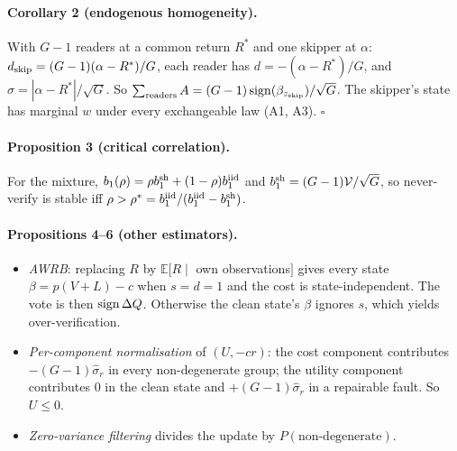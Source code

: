 \paragraph{Corollary 2 (endogenous homogeneity).} With $G-1$ readers at a common return $R^\ast$ and one skipper at
$\alpha$: $d_{\rm skip}=(G-1)(\alpha-R^\ast)/G$, each reader has $d=-(\alpha-R^\ast)/G$, and
$\hat\sigma=|\alpha-R^\ast|/\sqrt G$. So $\sum_{\rm readers}A=(G-1)\operatorname{sign}(\beta_{z_{\rm skip}})/\sqrt G$. The skipper's
state has marginal $w$ under every exchangeable law (A1, A3). $\square$

\paragraph{Proposition 3 (critical correlation).} For the mixture,
$b_1(\rho)=\rho b_1^{\rm sh}+(1-\rho)b_1^{\rm iid}$ and $b_1^{\rm sh}=(G-1)\mathcal V/\sqrt G$, so never-verify is
stable iff $\rho>\rho^\ast=b_1^{\rm iid}/(b_1^{\rm iid}-b_1^{\rm sh})$.

\paragraph{Propositions 4--6 (other estimators).}
\begin{itemize}
\item \emph{AWRB}: replacing $R$ by $\mathbb E[R\mid$ own observations$]$ gives every state $\beta=p(V+L)-c$ when
$s=d=1$ and the cost is state-independent. The vote is then $\operatorname{sign}\Delta Q$. Otherwise the clean state's $\beta$
ignores $s$, which yields over-verification.
\item \emph{Per-component normalisation} of $(U,-cr)$: the cost component contributes $-(G-1)\hat\sigma_r$ in every
non-degenerate group; the utility component contributes 0 in the clean state and $+(G-1)\hat\sigma_r$ in a
repairable fault. So $U\le0$.
\item \emph{Zero-variance filtering} divides the update by $P(\text{non-degenerate})$.
\end{itemize}

